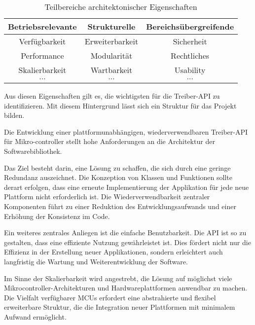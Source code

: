 \begin{table}[H]
	\begin{center}
		\begin{tabular}{ c | c | c }
			\textbf{Betriebsrelevante} & \textbf{Strukturelle} & \textbf{Bereichsübergreifende}\\
			\hline
			Verfügbarkeit & Erweiterbarkeit & Sicherheit\\
			Performance & Modularität & Rechtliches\\
			Skalierbarkeit & Wartbarkeit & Usability\\
			$\cdots$ & $\cdots$ & $\cdots$\\
		\end{tabular}
		\caption{Teilbereiche architektonischer Eigenschaften}
	    \label{tab:architektonische_eigenschaften}
	\end{center}
\end{table}

Aus diesen Eigenschaften gilt es, die wichtigsten für die Treiber-API zu identifizieren. 
Mit diesem Hintergrund lässt sich ein Struktur für das Projekt bilden.

Die Entwicklung einer plattformunabhängigen, wiederverwendbaren Treiber-API für Mikro-controller stellt hohe Anforderungen an die Architektur der Softwarebibliothek.

Das Ziel besteht darin, eine Lösung zu schaffen, die sich durch eine geringe Redundanz auszeichnet. 
Die Konzeption von Klassen und Funktionen sollte derart erfolgen, dass eine erneute Implementierung der Applikation für jede neue Plattform nicht erforderlich ist.
Die Wiederverwendbarkeit zentraler Komponenten führt zu einer Reduktion des Entwicklungsaufwands und einer Erhöhung der Konsistenz im Code.

Ein weiteres zentrales Anliegen ist die einfache Benutzbarkeit. 
Die API ist so zu gestalten, dass eine effiziente Nutzung gewährleistet ist. 
Dies fördert nicht nur die Effizienz in der Erstellung neuer Applikationen, sondern erleichtert auch langfristig die Wartung und Weiterentwicklung der Software.

Im Sinne der Skalierbarkeit wird angestrebt, die Lösung auf möglichst viele Mikrocontroller-Architekturen und Hardwareplattformen anwendbar zu machen.
Die Vielfalt verfügbarer MCUs erfordert eine abstrahierte und flexibel erweiterbare Struktur, die die Integration neuer Plattformen mit minimalem Aufwand ermöglicht.

